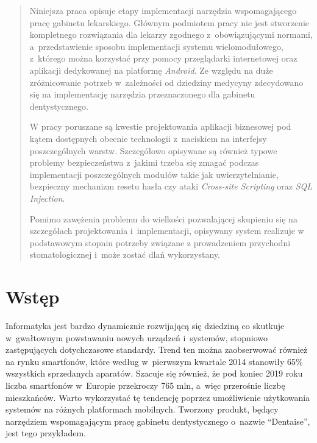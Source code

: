 \documentclass[11pt]{aghdpl}
\author{Mateusz Kulpa}
\date{2014}
\begin{document}
\titlepages

\begin{abstract}

Niniejsza praca opisuje etapy implementacji narzędzia wspomagającego pracę gabinetu lekarskiego. Głównym podmiotem pracy nie jest stworzenie kompletnego rozwiązania dla lekarzy zgodnego z~obowiązującymi normami, a~przedstawienie sposobu implementacji systemu wielomodułowego, z~którego można korzystać przy pomocy przeglądarki internetowej oraz aplikacji dedykowanej na platformę \emph{Android}. Ze względu na duże zróżnicowanie potrzeb w~zależności od dziedziny medycyny zdecydowano się na implementację narzędzia przeznaczonego dla gabinetu dentystycznego. 

W pracy poruszane są kwestie projektowania aplikacji biznesowej pod kątem dostępnych obecnie technologii z~naciskiem na interfejsy poszczególnych warstw. Szczegółowo opisywane są również typowe problemy bezpieczeństwa z~jakimi trzeba się zmagać podczas implementacji poszczególnych modułów takie jak uwierzytelnianie, bezpieczny mechanizm resetu hasła czy ataki \emph{Cross-site Scripting} oraz \emph{SQL Injection}.

Pomimo zawężenia problemu do wielkości pozwalającej skupieniu się na szczegółach projektowania i~implementacji, opisywany system realizuje w podstawowym stopniu potrzeby związane z prowadzeniem przychodni stomatologicznej i~może zostać dlań wykorzystany.

\end{abstract}

\setcounter{tocdepth}{3}
\tableofcontents
\clearpage


\chapter{Wstęp}
\label{cha:wstep}

Informatyka jest bardzo dynamicznie rozwijającą się dziedziną co skutkuje w~gwałtownym powstawaniu nowych urządzeń i~systemów, stopniowo zastępujących dotychczasowe standardy. Trend ten można zaobserwować również na rynku smartfonów, które według \cite{MG} w~pierwszym kwartale 2014 stanowiły 65\% wszystkich sprzedanych aparatów. Szacuje się również, że pod koniec 2019 roku liczba smartfonów w~Europie przekroczy 765 mln, a~więc przerośnie liczbę mieszkańców. Warto wykorzystać tę tendencję poprzez umożliwienie użytkowania systemów na różnych platformach mobilnych. Tworzony produkt, będący narzędziem wspomagającym pracę gabinetu dentystycznego o~nazwie ``Dentaise'', jest tego przykładem.
\end{document}
